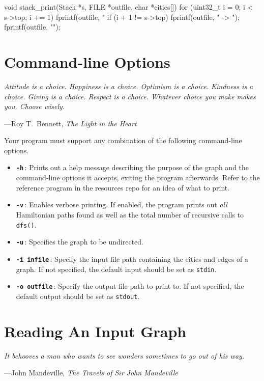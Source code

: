 \documentclass[11pt]{article}
\begin{document}
\begin{codelisting}{}
void stack_print(Stack *s, FILE *outfile, char *cities[]) {
    for (uint32_t i = 0; i < s->top; i += 1) {
        fprintf(outfile, "%
        if (i + 1 != s->top) {
            fprintf(outfile, " -> ");
        }
    }
    fprintf(outfile, "\n");
}
\end{codelisting}

\section{Command-line Options}

\textwidth
\epigraph{\emph{Attitude is a choice. Happiness is a choice. Optimism is
a choice. Kindness is a choice. Giving is a choice. Respect is a choice.
Whatever choice you make makes you. Choose wisely.}}{---Roy T.\ Bennett,
\emph{The Light in the Heart}}

Your program must support any combination of the following command-line
options.

\begin{itemize}
  \item \textbf{\texttt{-h}}\,: Prints out a help message describing the purpose
    of the graph and the command-line options it accepts, exiting the
    program afterwards. Refer to the reference program in the resources
    repo for an idea of what to print.
  \item \textbf{\texttt{-v}}\,: Enables verbose printing. If enabled,
    the program prints out \emph{all} Hamiltonian paths found as well as
    the total number of recursive calls to \texttt{dfs()}.
  \item \textbf{\texttt{-u}}\,: Specifies the graph to be undirected.
  \item \textbf{\texttt{-i infile}}\,: Specify the input file path
    containing the cities and edges of a graph. If not specified, the
    default input should be set as \texttt{stdin}.
  \item \textbf{\texttt{-o outfile}}\,: Specify the output file path to
    print to. If not specified, the default output should be set as
    \texttt{stdout}.
\end{itemize}

\section{Reading An Input Graph}

\textwidth
\epigraph{\emph{It behooves a man who
wants to see wonders sometimes to go out of his way.}}{---John
Mandeville, \emph{The Travels of Sir John Mandeville}}
\end{document}
